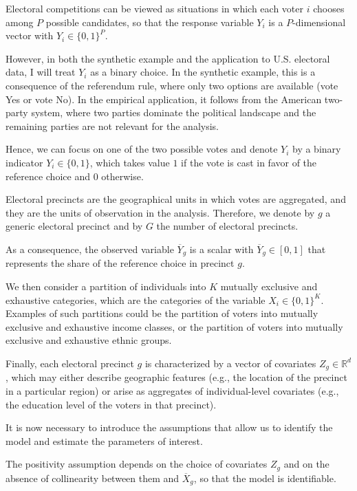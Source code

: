 Electoral competitions can be viewed as situations in which each voter $i$ chooses among $P$ possible candidates, so that the response variable $Y_i$ is a $P$-dimensional vector with $Y_i \in \{0,1\}^P$.

However, in both the synthetic example and the application to U.S. electoral data, I will treat $Y_i$ as a binary choice. In the synthetic example, this is a consequence of the referendum rule, where only two options are available (vote Yes or vote No). In the empirical application, it follows from the American two-party system, where two parties dominate the political landscape and the remaining parties are not relevant for the analysis.

Hence, we can focus on one of the two possible votes and denote $Y_i$ by a binary indicator $Y_i \in \{0,1\}$, which takes value $1$ if the vote is cast in favor of the reference choice and $0$ otherwise.

Electoral precincts are the geographical units in which votes are aggregated, and they are the units of observation in the analysis. Therefore, we denote by $g$ a generic electoral precinct and by $G$ the number of electoral precincts.

As a consequence, the observed variable $\overline{Y}_g$ is a scalar with $\overline{Y}_g \in [0,1]$ that represents the share of the reference choice in precinct $g$.

We then consider a partition of individuals into $K$ mutually exclusive and exhaustive categories, which are the categories of the variable $X_i \in \{0,1\}^K$. Examples of such partitions could be the partition of voters into mutually exclusive and exhaustive income classes, or the partition of voters into mutually exclusive and exhaustive ethnic groups.

Finally, each electoral precinct $g$ is characterized by a vector of covariates $Z_g \in \mathbb{R}^d$, which may either describe geographic features (e.g., the location of the precinct in a particular region) or arise as aggregates of individual-level covariates (e.g., the education level of the voters in that precinct).

It is now necessary to introduce the assumptions that allow us to identify the model and estimate the parameters of interest.

The positivity assumption depends on the choice of covariates $Z_g$ and on the absence of collinearity between them and $\overline{X}_g$, so that the model is identifiable.

